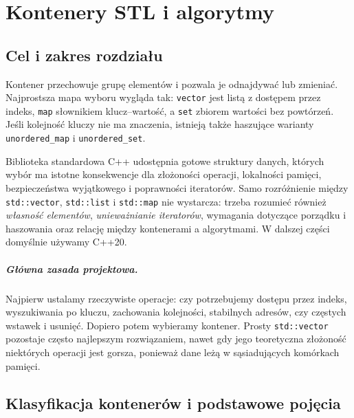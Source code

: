 
\chapter{Kontenery STL i algorytmy}
\label{chap:cpp-stl-containers}

\section{Cel i zakres rozdziału}

Kontener przechowuje grupę elementów i pozwala je odnajdywać lub
zmieniać. Najprostsza mapa wyboru wygląda tak: \texttt{vector} jest
listą z dostępem przez indeks, \texttt{map} słownikiem klucz--wartość,
a \texttt{set} zbiorem wartości bez powtórzeń. Jeśli kolejność kluczy
nie ma znaczenia, istnieją także haszujące warianty
\texttt{unordered\_map} i \texttt{unordered\_set}.

Biblioteka standardowa C++ udostępnia gotowe struktury danych, których wybór ma
istotne konsekwencje dla złożoności operacji, lokalności pamięci, bezpieczeństwa
wyjątkowego i poprawności iteratorów. Samo rozróżnienie między
\texttt{std::vector}, \texttt{std::list} i \texttt{std::map} nie wystarcza:
trzeba rozumieć również \emph{własność elementów}, \emph{unieważnianie
iteratorów}, wymagania dotyczące porządku i haszowania oraz relację między
kontenerami a algorytmami. W dalszej części domyślnie używamy C++20.

\paragraph{Główna zasada projektowa.}
Najpierw ustalamy rzeczywiste operacje: czy potrzebujemy dostępu przez
indeks, wyszukiwania po kluczu, zachowania kolejności, stabilnych adresów,
czy częstych wstawek i usunięć. Dopiero potem wybieramy kontener. Prosty
\texttt{std::vector} pozostaje często najlepszym rozwiązaniem, nawet gdy
jego teoretyczna złożoność niektórych operacji jest gorsza, ponieważ dane
leżą w sąsiadujących komórkach pamięci.

\section{Klasyfikacja kontenerów i podstawowe pojęcia}
\label{sec:cpp13-taxonomy}

